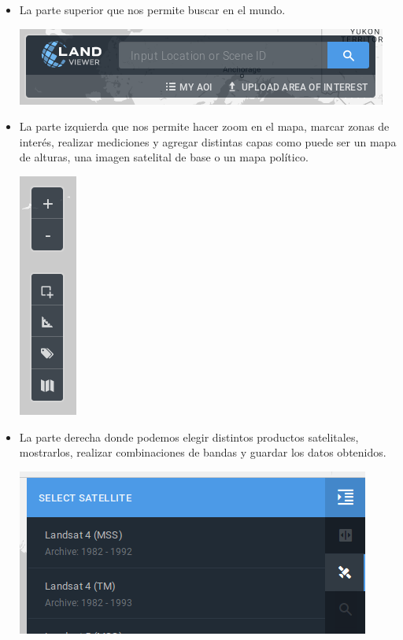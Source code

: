 \documentclass[a4paper,12pt]{book}
\begin{document}
\begin{itemize}
    \item La parte superior que nos permite buscar en el mundo.
     \begin{center}\includegraphics[scale=0.4]{in:search.png}\end{center}
    \item La parte izquierda que nos permite hacer zoom en el mapa, marcar zonas de interés, realizar mediciones y agregar distintas capas como puede ser un mapa de alturas, una imagen satelital de base o un mapa político.
     \begin{center}\includegraphics[scale=0.4]{in:edit.png}\end{center}
    \item La parte derecha donde podemos elegir distintos productos satelitales, mostrarlos, realizar combinaciones de bandas y guardar los datos obtenidos.
     \begin{center}\includegraphics[scale=0.4]{in:sat.png}\end{center}
\end{itemize}
\end{document}
